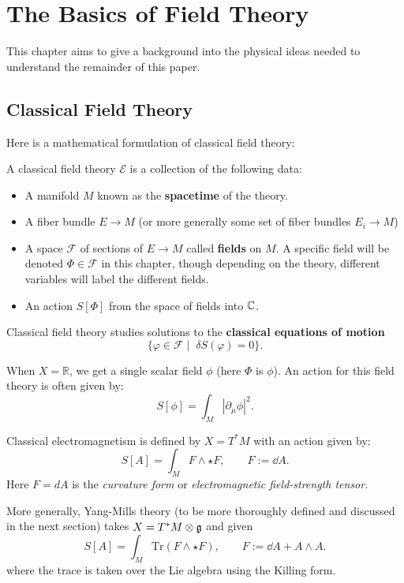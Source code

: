 \chapter{The Basics of Field Theory\label{ch:phys}}

	This chapter aims to give a background into the physical ideas needed to understand the remainder of this paper.
	
	\section{Classical Field Theory} %
	\label{sec:classical_field_theory}
	
	
	
	Here is a mathematical formulation of classical field theory:
	\begin{phys}
		A classical field theory $\mathcal E$ is a collection of the following data:
		\begin{itemize}
			\item A manifold $M$ known as the \textbf{spacetime} of the theory.
			\item A fiber bundle $E \to M$ (or more generally some set of fiber bundles $E_i \to M$)
			\item A space $\mathcal F$ of sections of $E \to M$ called \textbf{fields} on $M$. A specific field will be denoted $\Phi \in \mathcal F$ in this chapter, though depending on the theory, different variables will label the different fields.
			\item An action $S[\Phi]$ from the space of fields into $\mathbb{C}$.
		\end{itemize}
		Classical field theory studies solutions to the \textbf{classical equations of motion}
		$$\{\varphi \in \mathcal F \mid \; \delta S(\varphi) = 0 \}.$$
	\end{phys}
	\begin{eg}
		When $X = \mathbb R$, we get a single scalar field $\phi$ (here $\Phi$ is $\phi$). An action for this field theory is often given by:
		$$S[\phi] = \int_M |\partial_\mu \phi|^2.$$
	\end{eg}
	\begin{eg}
		Classical electromagnetism is defined by $X=T^* M$ with an action given by:
		$$S[A] = \int_M F \wedge \star F, \qquad F := \dd A.$$
		Here $F = dA$ is the \emph{curvature form} or \emph{electromagnetic field-strength tensor}.
		
		More generally, Yang-Mills theory (to be more thoroughly defined and discussed in the next section) takes $X=T^* M \otimes \frak g$ and given 
		$$S[A] = \int_M \mathrm{Tr}\left( F \wedge \star F \right), \qquad F := \dd A + A \wedge A.$$
		where the trace is taken over the Lie algebra using the Killing form. 
	\end{eg}
	
